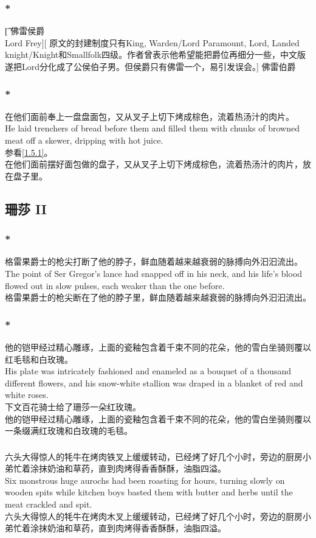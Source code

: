 \documentclass[12pt,a4paper]{article}
\newcommand{\h}[1]{{\color{red}#1}\\}
\newcommand{\la}[1]{{\color{blue}#1}\\}
\begin{document}
\subsubsection{\color{red}*}\t[
	佛雷侯爵\\
	Lord Frey][
	原文的封建制度只有King, Warden/Lord Paramount, Lord, Landed knight/Knight和Smallfolk四级。作者曾表示他希望能把爵位再细分一些，中文版遂把Lord分化成了公侯伯子男。但侯爵只有佛雷一个，易引发误会。]
	佛雷伯爵
	
\subsubsection{\color{red}*}\la{
	在他们面前奉上一盘盘面包，又从叉子上切下烤成棕色，流着热汤汁的肉片。\\
	He laid trenchers of bread before them and filled them with chunks of browned meat off a skewer, dripping with hot juice.}\h{
	参看\ref{1.5.1}。}
	在他们面前摆好面包做的盘子，又从叉子上切下烤成棕色，流着热汤汁的肉片，放在盘子里。
	
			
\subsection{珊莎 II}
\subsubsection{\color{red}*}\la{
	格雷果爵士的枪尖打断了他的脖子，鲜血随着越来越衰弱的脉搏向外汩汩流出。\\
	The point of Ser Gregor's lance had snapped off in his neck, and his life's blood flowed out in slow pulses, each weaker than the one before.}
	格雷果爵士的枪尖断在了他的脖子里，鲜血随着越来越衰弱的脉搏向外汩汩流出。
	
\subsubsection{\color{red}*}\la{
	他的铠甲经过精心雕琢，上面的瓷釉包含着千束不同的花朵，他的雪白坐骑则覆以红毛毯和白玫瑰。\\
	His plate was intricately fashioned and enameled as a bouquet of a thousand different flowers, and his snow-white stallion was draped in a blanket of red and white roses.}\h{
	下文百花骑士给了珊莎一朵红玫瑰。}
	他的铠甲经过精心雕琢，上面的瓷釉包含着千束不同的花朵，他的雪白坐骑则覆以一条缀满红玫瑰和白玫瑰的毛毯。
	
\subsubsection{}\la{
	六头大得惊人的牦牛在烤肉铁叉上缓缓转动，已经烤了好几个小时，旁边的厨房小弟忙着涂抹奶油和草药，直到肉烤得香香酥酥，油脂四溢。\\
	Six monstrous huge aurochs had been roasting for hours, turning slowly on wooden spits while kitchen boys basted them with butter and herbs until the meat crackled and spit.}
	六头大得惊人的牦牛在烤肉木叉上缓缓转动，已经烤了好几个小时，旁边的厨房小弟忙着涂抹奶油和草药，直到肉烤得香香酥酥，油脂四溢。
	
\end{document}

